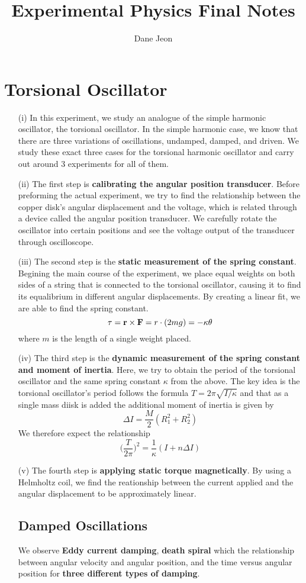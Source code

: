 

\title{Experimental Physics Final Notes}
\author{Dane Jeon}
\noaffiliation
\maketitle

\section{Torsional Oscillator}
\begin{itemize}
\item[(i)] In this experiment, we study an analogue of the simple harmonic oscillator, the torsional oscillator. In the simple harmonic case, we know that there are three variations of oscillations, undamped, damped, and driven. We study these exact three cases for the torsional harmonic oscillator and carry out around 3 experiments for all of them. 
\item[(ii)] The first step is {\bf calibrating the angular position transducer}. Before preforming the actual experiment, we try to find the relationship between the copper disk's angular displacement and the voltage, which is related through a device called the angular position transducer. We carefully rotate the oscillator into certain positions and see the voltage output of the transducer through oscilloscope.
\item[(iii)] The second step is the {\bf static measurement of the spring constant}. Begining the main course of the experiment, we place equal weights on both sides of a string that is connected to the torsional oscillator, causing it to find its equalibrium in different angular displacements. By creating a linear fit, we are able to find the spring constant.
\[\tau ={\bf r}\times {\bf F}=r\cdot  (2mg)=-\kappa \theta \]
where $m$ is the length of a single weight placed.
\item[(iv)] The third step is the {\bf dynamic measurement of the spring constant and moment of inertia}. Here, we try to obtain the period of the torsional oscillator and the same spring constant $\kappa $ from the above. The key idea is the torsional oscillator's period follows the formula $T=2\pi \sqrt{I/\kappa }$ and that as a single mass diisk is added the additional moment of inertia is given by
\[\Delta I=\dfrac{M}{2}(R_1^2+R_2^2)\]
We therefore expect the relationship
\[\Big(\dfrac{T}{2\pi }\Big)^2=\dfrac{1}{\kappa }(I+n\Delta I)\]
\item[(v)] The fourth step is {\bf applying static torque magnetically}. By using a Helmholtz coil, we find the reationship between the current applied and the angular displacement to be approximately linear.
\subsection{Damped Oscillations}
We observe {\bf Eddy current damping}, {\bf death spiral} which the relationship between angular velocity and angular position, and the time versus angular position for {\bf three different types of damping}.
\end{itemize}
